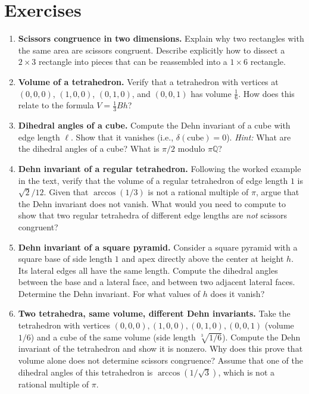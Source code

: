 \section{Exercises}

\begin{enumerate}
    \item \textbf{Scissors congruence in two dimensions.} Explain why two rectangles with the same area are scissors congruent. Describe explicitly how to dissect a $2 \times 3$ rectangle into pieces that can be reassembled into a $1 \times 6$ rectangle.

    \item \textbf{Volume of a tetrahedron.} Verify that a tetrahedron with vertices at $(0,0,0)$, $(1,0,0)$, $(0,1,0)$, and $(0,0,1)$ has volume $\frac{1}{6}$. How does this relate to the formula $V = \frac{1}{3}Bh$?

    \item \textbf{Dihedral angles of a cube.} Compute the Dehn invariant of a cube with edge length $\ell$. Show that it vanishes (i.e., $\delta(\text{cube}) = 0$). \emph{Hint:} What are the dihedral angles of a cube? What is $\pi/2$ modulo $\pi\mathbb{Q}$?

    \item \textbf{Dehn invariant of a regular tetrahedron.} Following the worked example in the text, verify that the volume of a regular tetrahedron of edge length $1$ is $\sqrt2/12$. Given that $\arccos(1/3)$ is not a rational multiple of $\pi$, argue that the Dehn invariant does not vanish. What would you need to compute to show that two regular tetrahedra of different edge lengths are \emph{not} scissors congruent?

    \item \textbf{Dehn invariant of a square pyramid.} Consider a square pyramid with a square base of side length $1$ and apex directly above the center at height $h$. Its lateral edges all have the same length. Compute the dihedral angles between the base and a lateral face, and between two adjacent lateral faces. Determine the Dehn invariant. For what values of $h$ does it vanish?

    \item \textbf{Two tetrahedra, same volume, different Dehn invariants.} Take the tetrahedron with vertices $(0,0,0), (1,0,0), (0,1,0), (0,0,1)$ (volume $1/6$) and a cube of the same volume (side length $\sqrt[3]{1/6}$). Compute the Dehn invariant of the tetrahedron and show it is nonzero. Why does this prove that volume alone does not determine scissors congruence? Assume that one of the dihedral angles of this tetrahedron is $\arccos(1/\sqrt{3})$, which is not a rational multiple of $\pi$.


\end{enumerate}

